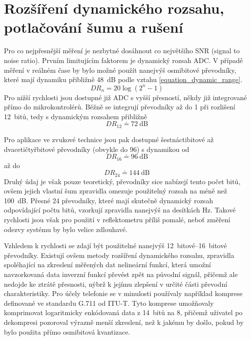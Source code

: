 \chapter{Rozšíření dynamického rozsahu, potlačování šumu a rušení}
Pro co nejpřesnější měření je nezbytné dosáhnout co největšího SNR (signal to noise ratio). Prvním limitujícím faktorem je dynamický rozsah ADC. V případě měření v reálném čase by bylo možné použít nanejvýš osmibitové převodníky, které mají dynamiku přibližně \SI{48}{\deci\bel} podle vztahu \ref{equation_dynamic_range}.
\begin{equation}
	 \mathit{DR}_n=20\log\left(2^n-1\right)
	 \label{equation_dynamic_range}
\end{equation}
Pro nižší rychlosti jsou dostupné již ADC s vyšší přesností, někdy již integrované přímo do mikrokontrolérů. Běžně se integrují převodníky až do \SI{1}{\megasample} při rozlišení 12~bitů, tedy s dynamickým rozsahem přibližně
\begin{equation}
	\mathit{DR}_{12}\doteq \SI{72}{\deci\bel}
\end{equation}

Pro aplikace ve zvukové technice jsou pak dostupné šestnáctibitové až dvacetičtyřbitové převodníky (obvykle do \SI{96}{\kilosample}) s dynamikou od 
\begin{equation}
	\mathit{DR}_{16}\doteq \SI{96}{\deci\bel}
\end{equation} až do
\begin{equation}
	\mathit{DR}_{24}\doteq \SI{144}{\deci\bel}
\end{equation}
 Druhý údaj je však pouze teoretický, převodníky sice nabízejí tento počet bitů, ovšem jejich vlastní šum zpravidla omezuje použitelný rozsah na méně než \SI{100}{\deci\bel}. Přesné \SI{24}{\bit} převodníky, které mají skutečně dynamický rozsah odpovídající počtu bitů, vzorkují zpravidla nanejvýš na desítkách \si{\hertz}. Takové rychlosti jsou však pro použití v reflektometru příliš pomalé, neboť změření odezvy systému by bylo velice zdlouhavé.

Vzhledem k rychlosti se zdají být použitelné nanejvýš \SIrange{12}{16}{bitové} převodníky. Existují ovšem metody rozšíření dynamického rozsahu, zpravidla spoléhající na zkreslení měřených dat nelineární funkcí, která umožní navzorkovaná data inverzní funkcí převést zpět na původní signál, přičemž ale nedojde ke ztrátě přesnosti, nýbrž k jejímu zlepšení v určité části převodní charakteristiky. Pro účely telefonie se v minulosti používaly například komprese definované ve standardu G.711 od ITU-T. Tyto komprese umožňovaly komprimovat logaritmicky enkódovaná data z 14~bitů na 8, přičemž uživatel po dekompresi pozoroval výrazně menší zkreslení, než k jakému by došlo, pokud by bylo použita přímo osmibitová kvantizace.

